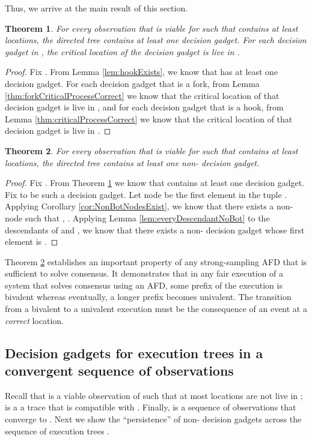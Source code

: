 \documentclass[11pt]{article}
\newtheorem{theorem}{Theorem}
\numberwithin{theorem}{section}
\begin{document}
Thus, we arrive at the main result of this section.


\begin{theorem}\label{thm:ViableGHasDecisionGadgets}
 For every observation  that is viable for  such that  contains at least  locations, the directed tree  contains at least one decision gadget. For each decision  gadget in , the critical location of the decision gadget is live in .
\end{theorem}
\begin{proof}
 Fix . From Lemma \ref{lem:hookExists}, we know that  has at least one decision gadget. For each decision gadget that is a fork, from Lemma \ref{thm:forkCriticalProcessCorrect} we know that the critical location of that decision gadget is live in , and for each decision gadget that is a hook, from Lemma \ref{thm:criticalProcessCorrect} we know that the critical location of that decision gadget is live in .
\end{proof}

\begin{theorem}\label{thm:ViableGHasNonBotDecisionGadgets}
For every observation  that is viable for  such that  contains at least  locations, the directed tree  contains at least one non- decision gadget.
\end{theorem}
\begin{proof}
Fix . From Theorem \ref{thm:ViableGHasDecisionGadgets} we know that  contains at least one decision gadget. Fix  to be such a decision gadget. Let node  be the first element in the tuple . Applying Corollary \ref{cor:NonBotNodesExist}, we know that there exists a non- node  such that , . Applying Lemma \ref{lem:everyDescendantNoBot} to the descendants of  and , we know that there exists a non- decision gadget  whose first element is .
\end{proof}


Theorem \ref{thm:ViableGHasNonBotDecisionGadgets} establishes an important property of any strong-sampling AFD that is sufficient to solve consensus. It demonstrates that in any fair execution of a system that solves consensus using an AFD, some prefix of the execution is bivalent whereas eventually, a longer prefix becomes univalent. The transition from a bivalent to a univalent execution must be the consequence of an event at a \emph{correct} location.


\subsection{Decision gadgets for execution trees in a convergent sequence of observations}
Recall that  is a viable observation of  such that at most  locations are not
live in ;  is a a trace that is compatible with . Finally,  is a sequence of observations that converge to . Next we show the ``persistence'' of non- decision gadgets across the sequence of execution trees .
\end{document}
